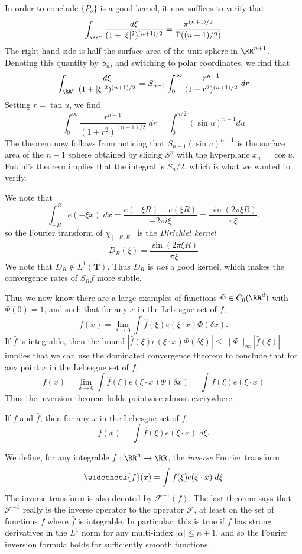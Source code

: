 \begin{example}
	In order to conclude $\{ P_\delta \}$ is a good kernel, it now suffices to verify that
	\[ \int_{\RR^n} \frac{d\xi}{(1 + |\xi|^2)^{(n+1)/2}} = \frac{\pi^{(n+1)/2}}{\Gamma((n+1)/2)} \]
	The right hand side is half the surface area of the unit sphere in $\RR^{n+1}$. Denoting this quantity by $S_n$, and switching to polar coordinates, we find that
	\[ \int_{\RR^n} \frac{d\xi}{(1 + |\xi|^2)^{(n+1)/2}} = S_{n-1} \int_0^\infty \frac{r^{n-1}}{(1 + r^2)^{(n+1)/2}}\; dr \]
	Setting $r = \tan u$, we find
	\[ \int_0^\infty \frac{r^{n-1}}{(1 + r^2)^{(n+1)/2}}\; dr = \int_0^{\pi/2} (\sin u)^{n-1} du \]
	The theorem now follows from noticing that $S_{n-1} (\sin u)^{n-1}$ is the surface area of the $n-1$ sphere obtained by slicing $S^n$ with the hyperplane $x_n = \cos u$. Fubini's theorem implies that the integral is $S_n/2$, which is what we wanted to verify.
\end{example}

\begin{example}
	We note that
	\[ \int_{-R}^R e(- \xi x)\; dx = \frac{e(- \xi R) - e(\xi R)}{-2 \pi i \xi} = \frac{\sin(2 \pi \xi R)}{\pi \xi}. \]
	so the Fourier transform of $\chi_{[-R,R]}$ is the \emph{Dirichlet kernel}
	\[ D_R(\xi) = \frac{\sin(2 \pi \xi R)}{\pi \xi} \]
	We note that $D_R \not \in L^1(\mathbf{T})$. Thus $D_R$ is {\it not} a good kernel, which makes the convergence rates of $S_R f$ more subtle.
\end{example}

Thus we now know there are a large examples of functions $\Phi \in C_0(\RR^d)$ with $\Phi(0) = 1$, and such that for any $x$ in the Lebesgue set of $f$,
%
\[ f(x) = \lim_{\delta \to 0} \int \widehat{f}(\xi) e(\xi \cdot x) \Phi(\delta x). \]
%
If $\widehat{f}$ is integrable, then the bound $| \widehat{f}(\xi) e(\xi \cdot x) \Phi(\delta \xi) | \leq \| \Phi \|_\infty | \widehat{f}(\xi) |$ implies that we can use the dominated convergence theorem to conclude that for any point $x$ in the Lebesgue set of $f$,
%
\[ f(x) = \lim_{\delta \to 0} \int \widehat{f}(\xi) e(\xi \cdot x) \Phi(\delta x) = \int \widehat{f}(\xi) e(\xi \cdot x) \]
%
Thus the inversion theorem holds pointwise almost everywhere.

\begin{theorem}
	If $f$ and $\widehat{f}$, then for any $x$ in the Lebesgue set of $f$,
	\[ f(x) = \int \widehat{f}(\xi) e(\xi \cdot x)\; d\xi. \]
\end{theorem}

We define, for any integrable $f: \RR^n \to \RR$, the \emph{inverse} Fourier transform
%
\[ \widecheck{f}(x) = \int f(\xi) e(\xi \cdot x)\; d\xi \]
%
The inverse transform is also denoted by $\mathcal{F}^{-1}(f)$. The last theorem says that $\mathcal{F}^{-1}$ really is the inverse operator to the operator $\mathcal{F}$, at least on the set of functions $f$ where $\widehat{f}$ is integrable. In particular, this is true if $f$ has strong derivatives in the $L^1$ norm for any multi-index $|\alpha| \leq n+1$, and so the Fourier inversion formula holds for sufficiently smooth functions.

